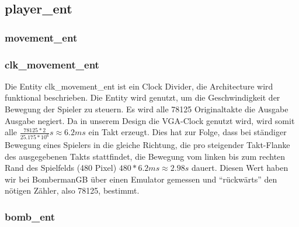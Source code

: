 \documentclass[parskip=full]{scrartcl}
\begin{document}
			\subsection{player\_ent}
				\subsubsection{movement\_ent}
				
				\subsubsection{clk\_movement\_ent}
					Die Entity clk\_movement\_ent ist ein Clock Divider, die Architecture wird funktional beschrieben. Die Entity wird genutzt, um die Geschwindigkeit der Bewegung der Spieler zu steuern. Es wird alle 78125 Originaltakte die Ausgabe Ausgabe negiert. Da in unserem Design die VGA-Clock genutzt wird, wird somit alle $\frac{78125 * 2}{25.175 * 10^6}s \approx 6.2ms$ ein Takt erzeugt. Dies hat zur Folge, dass bei ständiger Bewegung eines Spielers in die gleiche Richtung, die pro steigender Takt-Flanke des ausgegebenen Takts stattfindet, die Bewegung vom linken bis zum rechten Rand des Spielfelds (480 Pixel) $480 * 6.2 ms \approx 2.98 s$ dauert. Diesen Wert haben wir bei BombermanGB über einen Emulator gemessen und \enquote{rückwärts} den nötigen Zähler, also 78125, bestimmt.
				\subsubsection{bomb\_ent}
			
			
\end{document}
